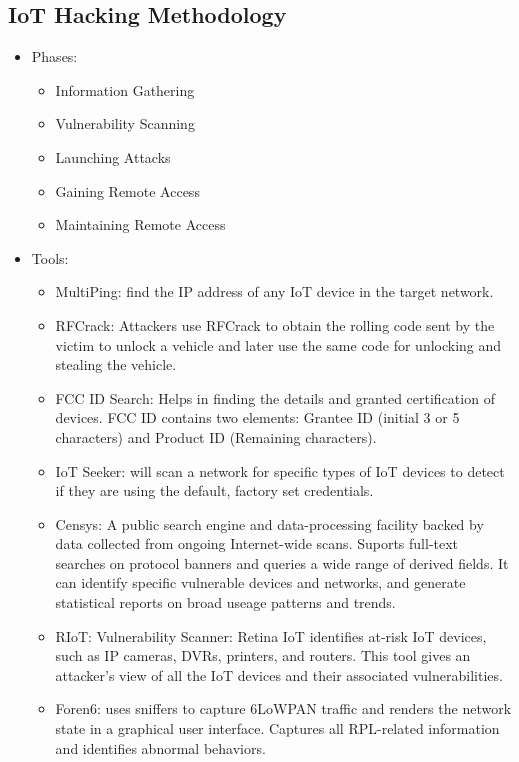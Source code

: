 \subsection{IoT Hacking Methodology}
\begin{itemize}
    \item Phases:
    \begin{itemize}
        \item Information Gathering
        \item Vulnerability Scanning
        \item Launching Attacks
        \item Gaining Remote Access
        \item Maintaining Remote Access
    \end{itemize}
    \item Tools:
    \begin{itemize}
        \item MultiPing: find the IP address of any IoT device in the target network.
        \item RFCrack: Attackers use RFCrack to obtain the rolling code sent by the victim to unlock a vehicle and later use the same code for unlocking and stealing the vehicle.
        \item FCC ID Search: Helps in finding the details and granted certification of devices. FCC ID contains two elements: Grantee ID (initial 3 or 5 characters) and Product ID (Remaining characters).
        \item IoT Seeker: will scan a network for specific types of IoT devices to detect if they are using the default, factory set credentials.
        \item Censys: A public search engine and data-processing facility backed by data collected from ongoing Internet-wide scans. Suports full-text searches on protocol banners and queries a wide range of derived fields. It can identify specific vulnerable devices and networks, and generate statistical reports on broad useage patterns and trends.
        \item RIoT: Vulnerability Scanner: Retina IoT identifies at-risk IoT devices, such as IP cameras, DVRs, printers, and routers. This tool gives an attacker's view of all the IoT devices and their associated vulnerabilities.
        \item Foren6: uses sniffers to capture 6LoWPAN traffic and renders the network state in a graphical user interface. Captures all RPL-related information and identifies abnormal behaviors.

\end{itemize}
\end{itemize}
